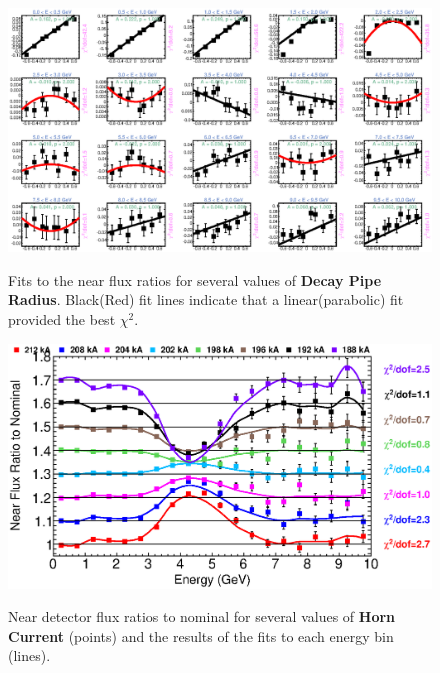 {\begin{figure}[ht]
  \begin{center}
    {\includegraphics[width=5.0in]{figures/DecayPipeRadius_near_fits.eps}}
  \end{center}
\caption{ Fits to the near flux ratios for several values of {\bf Decay Pipe Radius}. Black(Red) fit lines indicate that a linear(parabolic) fit provided the best $\chi^2$. }
\end{figure}

\begin{figure}[ht]
  \begin{center}
    {\includegraphics[width=6.0in]{figures/HornCurrent_near_summary.eps}}
  \end{center}
\caption{ Near detector flux ratios to nominal for several values of {\bf Horn Current} (points) and the results of the fits to each energy bin (lines).}
\end{figure}

}
